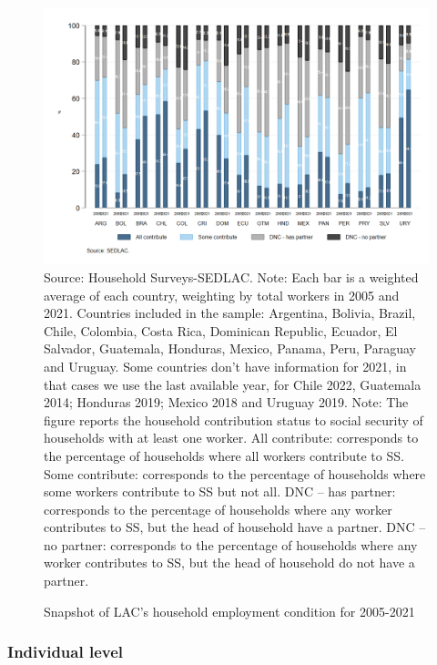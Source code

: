 \documentclass[english]{article}
\begin{document}
\begin{itemize}
\begin{figure}[!htb]
    \justifying
    \caption{Snapshot of LAC’s household employment condition for 2005-2021}     
    \includegraphics[scale=.3]{latex/figures/Household/snapshot_household_2005-2021.png}
    \label{fig:Household20052021}
    \footnotesize{Source: Household Surveys-SEDLAC.}
    \footnotesize{Note: Each bar is a weighted average of each country, weighting by total workers in 2005 and 2021. Countries included in the sample: Argentina, Bolivia, Brazil, Chile, Colombia, Costa Rica, Dominican Republic, Ecuador, El Salvador, Guatemala, Honduras, Mexico, Panama, Peru, Paraguay and Uruguay. Some countries don’t have information for 2021, in that cases we use the last available year, for Chile 2022, Guatemala 2014; Honduras 2019; Mexico 2018 and Uruguay 2019.}
    \footnotesize{Note: The figure reports the household contribution status to social security of households with at least one worker.   All contribute: corresponds to the percentage of households where all workers contribute to SS. Some contribute: corresponds to the percentage of households where some workers contribute to SS but not all. DNC – has partner: corresponds to the percentage of households where any worker contributes to SS, but the head of household have a partner. DNC – no partner: corresponds to the percentage of households where any worker contributes to SS, but the head of household do not have a partner. }
\end{figure}

\subsubsection{Individual level} %


\end{itemize}
\end{document}

